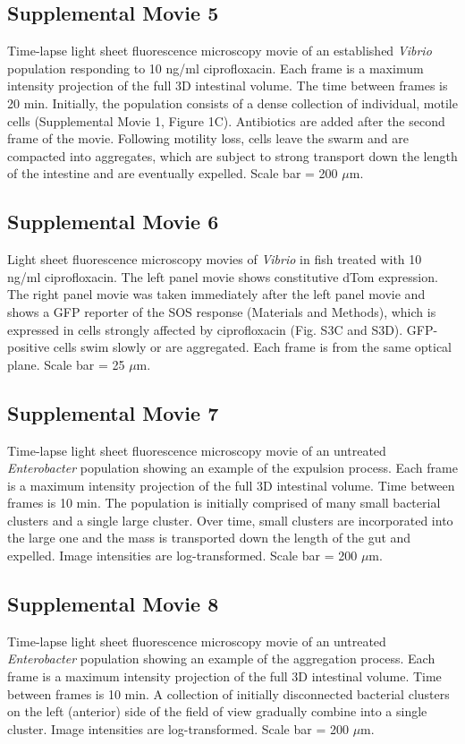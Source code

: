 {{{{{{{{{\subsection*{Supplemental Movie 5}
Time-lapse light sheet fluorescence microscopy movie of an established \textit{Vibrio} population responding to 10 ng/ml ciprofloxacin. Each frame is a maximum intensity projection of the full 3D intestinal volume.  The time between frames is 20 min. Initially, the population consists of a dense collection of individual, motile cells (Supplemental Movie 1, Figure 1C). Antibiotics are added after the second frame of the movie.  Following motility loss, cells leave the swarm and are compacted into aggregates, which are subject to strong transport down the length of the intestine and are eventually expelled. Scale bar = 200 $\mu$m.

\subsection*{Supplemental Movie 6}
Light sheet fluorescence microscopy movies of \textit{Vibrio} in fish treated with 10 ng/ml ciprofloxacin. The left panel movie shows constitutive dTom expression. The right panel movie was taken immediately after the left panel movie and shows a GFP reporter of the SOS response (Materials and Methods), which is expressed in cells strongly affected by ciprofloxacin (Fig. S3C and S3D). GFP-positive cells swim slowly or are aggregated. Each frame is from the same optical plane. Scale bar = 25 $\mu$m. 

\subsection*{Supplemental Movie 7}
Time-lapse light sheet fluorescence microscopy movie of an untreated \textit{Enterobacter} population showing an example of the expulsion process. Each frame is a maximum intensity projection of the full 3D intestinal volume. Time between frames is 10 min. The population is initially comprised of many small bacterial clusters and a single large cluster. Over time, small clusters are incorporated into the large one and the mass is transported down the length of the gut and expelled. Image intensities are log-transformed. Scale bar = 200 $\mu$m.

\subsection*{Supplemental Movie 8}
Time-lapse light sheet fluorescence microscopy movie of an untreated \textit{Enterobacter} population showing an example of the aggregation process. Each frame is a maximum intensity projection of the full 3D intestinal volume. Time between frames is 10 min. A collection of initially disconnected bacterial clusters on the left (anterior) side of the field of view gradually combine into a single cluster. Image intensities are log-transformed. Scale bar = 200 $\mu$m.

}}}}}}}}}

